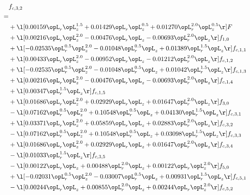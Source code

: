 \begin{alignat}{2} 
\label{eq:f_32_1} 
& f_{c,3,2} \nonumber \\ 
 = \\ 
& + \l[  0.00159 \opL_r \opL_z^{1.5} +  0.01429 \opL_r \opL_z^{0.5} +  0.01270 \opL_r^{2.0} \opL_z^{0.5}  \r] F \nonumber \\ 
& + \l[  0.00216 \opL_r \opL_z^{2.0}   -0.00476 \opL_r \opL_z   -0.00693 \opL_r^{2.0} \opL_z  \r] f_{1,0} \nonumber \\ 
& + \l[  -0.02535 \opL_r^{0.5} \opL_z^{2.0}   -0.01048 \opL_r^{0.5} \opL_z +  0.01389 \opL_r^{1.5} \opL_z  \r] f_{c,1,1} \nonumber \\ 
& + \l[  0.00433 \opL_r \opL_z^{2.0}   -0.00952 \opL_r \opL_z   -0.01212 \opL_r^{2.0} \opL_z  \r] f_{c,1,2} \nonumber \\ 
& + \l[  -0.02535 \opL_r^{0.5} \opL_z^{2.0}   -0.01048 \opL_r^{0.5} \opL_z +  0.01042 \opL_r^{1.5} \opL_z  \r] f_{c,1,3} \nonumber \\ 
& + \l[  0.00216 \opL_r \opL_z^{2.0}   -0.00476 \opL_r \opL_z   -0.00693 \opL_r^{2.0} \opL_z  \r] f_{c,1,4} \nonumber \\ 
& + \l[  0.00347 \opL_r^{1.5} \opL_z  \r] f_{c,1,5} \nonumber \\ 
& + \l[  0.01686 \opL_r \opL_z^{2.0} +  0.02929 \opL_r \opL_z +  0.01647 \opL_r^{2.0} \opL_z  \r] f_{3,0} \nonumber \\ 
& - \l[  0.07162 \opL_r^{0.5} \opL_z^{2.0} +  0.10548 \opL_r^{0.5} \opL_z +  0.04130 \opL_r^{1.5} \opL_z  \r] f_{c,3,1} \nonumber \\ 
& + \l[  0.03371 \opL_r \opL_z^{2.0} +  0.05859 \opL_r \opL_z +  0.02883 \opL_r^{2.0} \opL_z  \r] f_{c,3,2} \nonumber \\ 
& - \l[  0.07162 \opL_r^{0.5} \opL_z^{2.0} +  0.10548 \opL_r^{0.5} \opL_z +  0.03098 \opL_r^{1.5} \opL_z  \r] f_{c,3,3} \nonumber \\ 
& + \l[  0.01686 \opL_r \opL_z^{2.0} +  0.02929 \opL_r \opL_z +  0.01647 \opL_r^{2.0} \opL_z  \r] f_{c,3,4} \nonumber \\ 
& - \l[  0.01033 \opL_r^{1.5} \opL_z  \r] f_{c,3,5} \nonumber \\ 
& - \l[  0.00122 \opL_r \opL_z +  0.00488 \opL_r^{2.0} \opL_z +  0.00122 \opL_r \opL_z^{2.0}  \r] f_{5,0} \nonumber \\ 
& + \l[  -0.02031 \opL_r^{0.5} \opL_z^{2.0}   -0.03007 \opL_r^{0.5} \opL_z +  0.00931 \opL_r^{1.5} \opL_z  \r] f_{c,5,1} \nonumber \\ 
& - \l[  0.00244 \opL_r \opL_z +  0.00855 \opL_r^{2.0} \opL_z +  0.00244 \opL_r \opL_z^{2.0}  \r] f_{c,5,2} \nonumber \\ 

\end{alignat}
